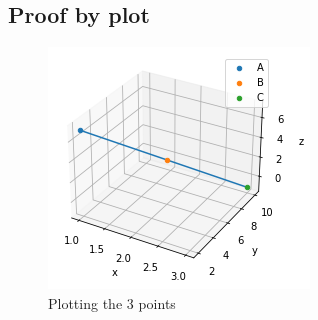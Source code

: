 \documentclass[journal,12pt,twocolumn]{IEEEtran}
\begin{document}
\subsection{Proof by plot}
\begin{figure}[ht]
    \centering
    \includegraphics[scale=0.5]{figs/pointsCollinear.png}
    \caption{Plotting the 3 points}
    \label{fig:collinearPoints}
\end{figure}
\end{document}
